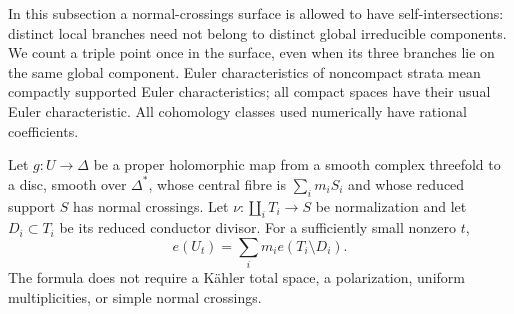 
In this subsection a normal-crossings surface is allowed to have self-intersections: distinct local branches need not belong to distinct global irreducible components. We count a triple point once in the surface, even when its three branches lie on the same global component. Euler characteristics of noncompact strata mean compactly supported Euler characteristics; all compact spaces have their usual Euler characteristic. All cohomology classes used numerically have rational coefficients.

\begin{proposition}\label{cdp:st:C.2.NC.1}
Let $g:U\to\Delta$ be a proper holomorphic map from a smooth complex threefold to a disc, smooth over $\Delta^*$, whose central fibre is $\sum_i m_iS_i$ and whose reduced support $S$ has normal crossings. Let $\nu:\coprod_i T_i\to S$ be normalization and let $D_i\subset T_i$ be its reduced conductor divisor. For a sufficiently small nonzero $t$,
\[
 e(U_t)=\sum_i m_i e(T_i\setminus D_i).
 \tag{C.NC.1}\label{cdp:eq:C.NC.1}
\]
The formula does not require a Kähler total space, a polarization, uniform multiplicities, or simple normal crossings.
\end{proposition}
